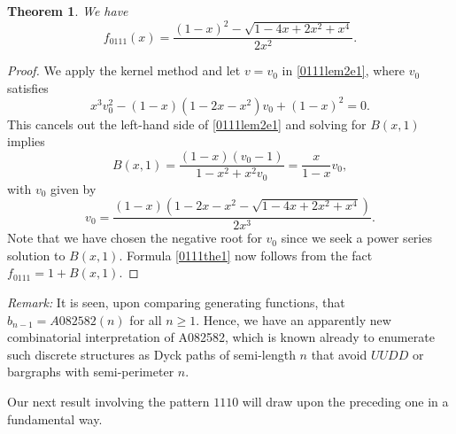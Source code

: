 \documentclass{article}
\theoremstyle{remark}
\theoremstyle{plain}
\newtheorem{theorem}{Theorem}[section]
\begin{document}
\begin{theorem}\label{0111th}
We have
\begin{equation}\label{0111the1}
f_{0111}(x)=\frac{(1-x)^2-\sqrt{1-4x+2x^2+x^4}}{2x^2}.
\end{equation}
\end{theorem}
\begin{proof}
We apply the kernel method and let $v=v_0$ in \eqref{0111lem2e1}, where $v_0$ satisfies
$$x^3v_0^2-(1-x)(1-2x-x^2)v_0+(1-x)^2=0.$$
This cancels out the left-hand side of \eqref{0111lem2e1} and solving for $B(x,1)$ implies
$$B(x,1)=\frac{(1-x)(v_0-1)}{1-x^2+x^2v_0}=\frac{x}{1-x}v_0,$$
with $v_0$ given by
$$v_0=\frac{(1-x)\left(1-2x-x^2-\sqrt{1-4x+2x^2+x^4}\right)}{2x^3}.$$
Note that we have chosen the negative root for $v_0$ since we seek a power series solution to $B(x,1)$.
Formula \eqref{0111the1} now follows from the fact $f_{0111}=1+B(x,1)$.
\end{proof}

\noindent \emph{Remark:}  It is seen, upon comparing generating functions, that $b_{n-1}=A082582(n)$ for all $n \geq1$.  Hence, we have an apparently new combinatorial interpretation of A082582, which is known already to enumerate such discrete structures as Dyck paths of semi-length $n$ that avoid $UUDD$ or bargraphs with semi-perimeter $n$.

Our next result involving the pattern $1110$ will draw upon the preceding one in a fundamental way.
\end{document}

